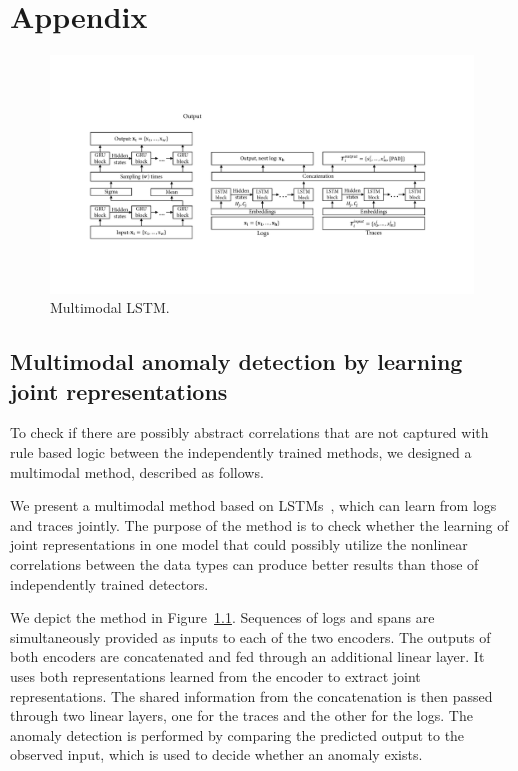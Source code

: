 
\chapter{Appendix}\label{appendixA}
\begin{figure}[!htbp]
\centerline{\includegraphics[width=1.0\textwidth]{gfx/chap7/multimodal.pdf}}
\caption{Multimodal LSTM.}
\label{fig:multimodaljoint}
\end{figure}

\section{Multimodal anomaly detection by learning joint representations}
To check if there are possibly abstract correlations that are not captured with rule based logic between the independently trained methods, we designed a multimodal method, described as follows.

We present a multimodal method based on LSTMs~\cite{nedelkoski2020jointmodalities}, which can learn from logs and traces jointly. The purpose of the method is to check whether the learning of joint representations in one model that could possibly utilize the nonlinear correlations between the data types can produce better results than those of  independently trained detectors. 

We depict the method in Figure~\ref{fig:multimodaljoint}.
Sequences of logs and spans are simultaneously provided as inputs to each of the two encoders. The outputs of both encoders are concatenated and fed through an additional linear layer. It uses both representations learned from the encoder to extract joint representations. The shared information from the concatenation is then passed through two linear layers, one for the traces and the other for the logs. The anomaly detection is performed by comparing the predicted output to the observed input, which is used to decide whether an anomaly exists. 

